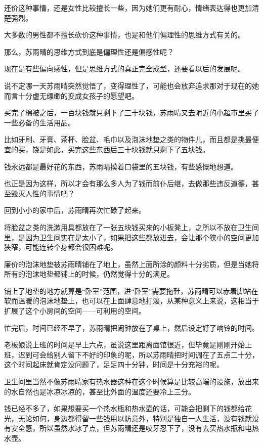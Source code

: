 还价这种事情，还是女性比较擅长一些，因为她们更有耐心，情绪表达得也更加清楚强烈。

大多数的男性都不擅长砍价这种事情，也是和他们偏理性的思维方式有关的。

那么，苏雨晴的思维方式到底是偏理性还是偏感性呢？

现在是有些偏向感性，但是思维方式的真正完全成型，还要看以后的发展呢。

说不定哪一天苏雨晴突然觉悟了，变得理性了，可能也会放弃追求那对于现在的她而言十分虚无缥缈的变成女孩子的愿望吧。

买完了棉被之后，一百块钱就只剩下了三十块钱，苏雨晴又去附近的小超市里买了一些必备的生活用品。

比如牙刷、牙膏、茶杯、脸盆、毛巾以及泡沫地垫之类的物件儿，而且都是挑最便宜的买，饶是如此，买完这些东西后三十块钱就只剩下了五块钱。

钱永远都是最好花的东西，苏雨晴摸着口袋里的五块钱，有些感慨地想道。

也正是因为这样，所以才会有那么多人为了钱而前仆后继，去做那些违反道德，甚至毁灭人性的事情吧？

回到小小的家中后，苏雨晴再次忙碌了起来。

将脸盆之类的洗漱用具都放在了一张五块钱买来的小板凳上，之所以不放在卫生间里，是因为卫生间实在是太小了，如果把这些都放进去，会让那个狭小的空间更加狭窄，可能连转个身都会很困难呢。

廉价的泡沫地垫被苏雨晴铺在了地上，虽然上面所涂的颜料十分劣质，但是当她将所有的泡沫地垫都铺上的时候，仍然觉得十分的满足。

铺上了地垫的地方就算是“卧室”范围，进“卧室”需要拖鞋，苏雨晴可以赤着脚站在软而温暖的泡沫地垫上，也可以在上面肆意地打滚，从某种意义上来说，这相当于扩展了这个小房间的空间——可利用的空间。

忙完后，时间已经不早了，苏雨晴把闹钟放在了桌上，然后设定好了响铃的时间。

老板娘说上班的时间是早上六点，虽说这里距离面馆很近，但毕竟是刚刚开始上班，迟到可会给别人留下不好的印象的呢，所以苏雨晴把时间调在了五点二十分，这个时间起床就肯定没问题了，足足四十分钟，时间是十分充裕的呢。

卫生间里当然不像苏雨晴家有热水器这种在这个时候算是比较高端的设施，放出来的水自然也是冰凉冰凉的，甚至比外面的温度还要冷上三分。

钱已经不多了，如果想要买一个热水瓶和热水壶的话，可能会把剩下的钱都给花光，无论如何，身边都得留一些钱用以防意外，特别是独自一人生活，没有钱就没有安全感，所以虽然水冰了点，但苏雨晴还是咬牙忍下了，没有去买热水瓶和电热水壶。

